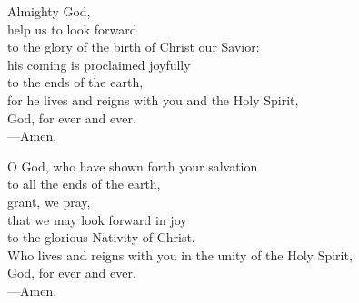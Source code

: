 \prayer


\begin{prayerverse}
Almighty God,\\
help us to look forward\\
to the glory of the birth of Christ our Savior:\\
his coming is proclaimed joyfully\\
to the ends of the earth,\\
for he lives and reigns with you and the Holy Spirit,\\
God, for ever and ever. \\
{\color{red}---\thinspace}Amen.
\end{prayerverse}


\begin{prayerverse}
O God, who have shown forth your salvation\\
to all the ends of the earth,\\
grant, we pray,\\
that we may look forward in joy\\
to the glorious Nativity of Christ.\\
Who lives and reigns with you in the unity of the Holy Spirit,\\
God, for ever and ever. \\
{\color{red}---\thinspace}Amen.
\end{prayerverse}


